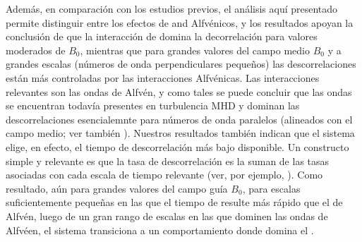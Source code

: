 Además, en comparación con los estudios previos, el análisis aquí
presentado permite distinguir entre los efectos de \sweeping and
Alfvénicos, y los resultados apoyan la conclusión de que la
interacción de \sweeping domina la decorrelación para valores
moderados de $B_0$, mientras que para grandes valores del campo medio
$B_0$ y a grandes escalas (números de onda perpendiculares pequeños)
las descorrelaciones están más controladas por las interacciones
Alfvénicas.  Las interacciones relevantes son las ondas de Alfvén, y
como tales se puede concluir que las ondas se encuentran todavía
presentes en turbulencia MHD y dominan las descorrelaciones
esencialemnte para números de onda paralelos (alineados con el campo
medio; ver también \cite{meyrand_direct_2016,
  meyrand_weak_2015}). Nuestros resultados también indican que el
sistema elige, en efecto, el tiempo de descorrelación más bajo
disponible. Un constructo simple y relevante es que la tasa de
descorrelación es la suman de las tasas asociadas con cada escala de
tiempo relevante (ver, por ejemplo, \cite{pouquet_strong_1976,
  zhou_magnetohydrodynamic_2004}). Como resultado, aún para grandes
valores del campo guía $B_0$, para escalas suficientemente pequeñas en
las que el tiempo de \sweeping resulte más rápido que el de Alfvén,
luego de un gran rango de escalas en las que dominen las ondas de
Alfvéen, el sistema transiciona a un comportamiento donde domina el
\sweeping.


